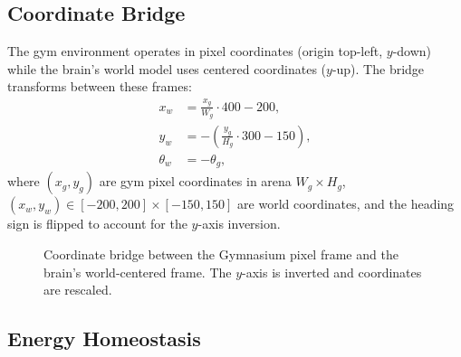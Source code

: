 \documentclass[11pt,a4paper]{article}
\begin{document}
\subsection{Coordinate Bridge}

The gym environment operates in pixel coordinates (origin top-left, $y$-down)
while the brain's world model uses centered coordinates ($y$-up).
The bridge transforms between these frames:
\begin{equation}\label{eq:coord_bridge}
\begin{aligned}
  x_w &= \frac{x_g}{W_g}\cdot 400 - 200, \\
  y_w &= -\!\left(\frac{y_g}{H_g}\cdot 300 - 150\right), \\
  \theta_w &= -\theta_g,
\end{aligned}
\end{equation}
where $(x_g, y_g)$ are gym pixel coordinates in arena $W_g \times H_g$,
$(x_w, y_w) \in [-200, 200] \times [-150, 150]$ are world coordinates,
and the heading sign is flipped to account for the $y$-axis inversion.

\begin{figure}[H]
\centering
{}
\caption{Coordinate bridge between the Gymnasium pixel frame and the
  brain's world-centered frame. The $y$-axis is inverted and coordinates
  are rescaled.}
\label{fig:coord_bridge}
\end{figure}

\subsection{Energy Homeostasis}
\end{document}
